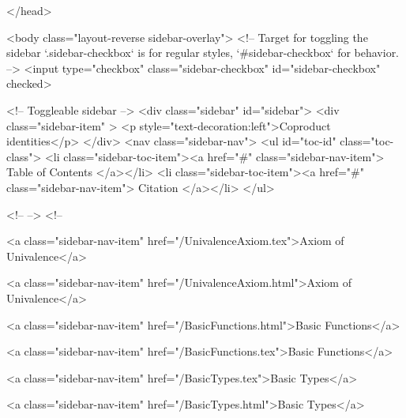   
</head>




  <body class="layout-reverse sidebar-overlay">
    <!-- Target for toggling the sidebar `.sidebar-checkbox` is for regular
     styles, `#sidebar-checkbox` for behavior. -->
<input type="checkbox" class="sidebar-checkbox" id="sidebar-checkbox" checked>

<!-- Toggleable sidebar -->
<div class="sidebar" id="sidebar">
  <div class="sidebar-item" >
    <p style="text-decoration:left">Coproduct identities</p>
  </div>
  <nav class="sidebar-nav">
    <ul id="toc-id" class="toc-class">
  <li class="sidebar-toc-item"><a href="#" class="sidebar-nav-item"> Table of Contents </a></li>
  <li class="sidebar-toc-item"><a href="#" class="sidebar-nav-item"> Citation </a></li>
</ul>


    <!--  -->
    <!-- 
      
    
      
    
      
    
      
    
      
        
      
    
      
        
          <a class="sidebar-nav-item" href="/UnivalenceAxiom.tex">Axiom of Univalence</a>
        
      
    
      
        
          <a class="sidebar-nav-item" href="/UnivalenceAxiom.html">Axiom of Univalence</a>
        
      
    
      
        
          <a class="sidebar-nav-item" href="/BasicFunctions.html">Basic Functions</a>
        
      
    
      
        
          <a class="sidebar-nav-item" href="/BasicFunctions.tex">Basic Functions</a>
        
      
    
      
        
          <a class="sidebar-nav-item" href="/BasicTypes.tex">Basic Types</a>
        
      
    
      
        
          <a class="sidebar-nav-item" href="/BasicTypes.html">Basic Types</a>
        
      
    

